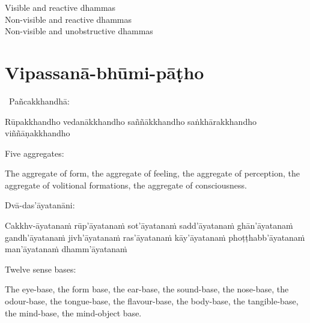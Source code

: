 \begin{english-verses}
  Visible and reactive dhammas\\
  Non-visible and reactive dhammas\\
  Non-visible and unobstructive dhammas
\end{english-verses}

\suttaRef{[Dhs 1]}

\section{Vipassanā-bhūmi-pāṭho}
\label{vipassana-bhumi-patho}

\begin{leader-only}
  \anglebracketleft\ \hspace{-0.5mm}Pañcakkhandhā: \hspace{-1.00mm}\anglebracketright\
\end{leader-only}

\begin{pali-hangtogether}
  Rūpakkhandho vedanākkhandho saññākkhandho saṅkhārakkhandho viññāṇakkhandho
\end{pali-hangtogether}

\begin{english-verses}
  Five aggregates:
  \begin{english-hangtogether-verses}
    The aggregate of form, the aggregate of feeling, the aggregate of perception, the aggregate of volitional formations, the aggregate of consciousness.
  \end{english-hangtogether-verses}
\end{english-verses}

\suttaRef{[MN 109]}

\begin{pali-hang-continued}
  Dvā-das'āyatanāni:
  \begin{pali-hangtogether}
    Cakkhv-āyatanaṁ rūp'āyatanaṁ sot'āyatanaṁ sadd'āyatanaṁ ghān'āyatanaṁ gandh'āyatanaṁ jivh'āyatanaṁ ras'āyatanaṁ kāy'āyatanaṁ phoṭṭhabb'āyatanaṁ man'āyatanaṁ dhamm'āyatanaṁ
  \end{pali-hangtogether}
\end{pali-hang-continued}

\begin{english-verses}
  Twelve sense bases:
  \begin{english-hangtogether-verses}
    The eye-base, the form base, the ear-base, the sound-base, the nose-base, the odour-base, the tongue-base, the flavour-base, the body-base, the tangible-base, the mind-base, the mind-object base.
  \end{english-hangtogether-verses}
\end{english-verses}


